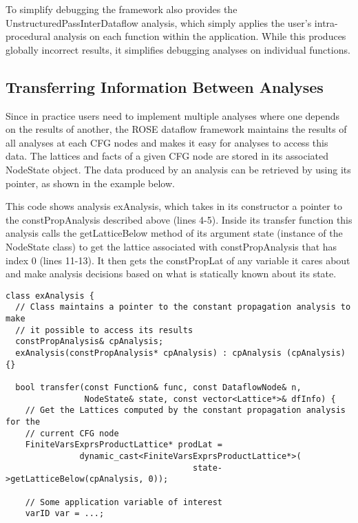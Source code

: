 {To simplify debugging the framework also provides the {\scriptsize UnstructuredPassInterDataflow} analysis, which simply applies the user’s intra-procedural analysis on each function within the application. While this produces globally incorrect results, it simplifies debugging analyses on individual functions. 

\subsection{Transferring Information Between Analyses}
\label{transfer_analyses}
Since in practice users need to implement multiple analyses where one depends on the results of another, the ROSE dataflow framework maintains the results of all analyses at each CFG nodes and makes it easy for analyses to access this data. The lattices and facts of a given CFG node are stored in its associated {\scriptsize NodeState} object. The data produced by an analysis can be retrieved by using its pointer, as shown in the example below.

This code shows analysis {\scriptsize exAnalysis}, which takes in its constructor a pointer to the {\scriptsize constPropAnalysis} described above (lines 4-5). Inside its transfer function this analysis calls the {\scriptsize getLatticeBelow} method of its argument state (instance of the {\scriptsize NodeState} class) to get the lattice associated with {\scriptsize constPropAnalysis} that has index 0 (lines 11-13). It then gets the {\scriptsize constPropLat} of any variable it cares about and make analysis decisions based on what is statically known about its state.

\begin{frame}
\centering
\begin{lstlisting}
class exAnalysis {
  // Class maintains a pointer to the constant propagation analysis to make 
  // it possible to access its results
  constPropAnalysis& cpAnalysis;
  exAnalysis(constPropAnalysis* cpAnalysis) : cpAnalysis (cpAnalysis) {}

  bool transfer(const Function& func, const DataflowNode& n, 
                NodeState& state, const vector<Lattice*>& dfInfo) {
    // Get the Lattices computed by the constant propagation analysis for the 
    // current CFG node
    FiniteVarsExprsProductLattice* prodLat = 
               dynamic_cast<FiniteVarsExprsProductLattice*>(
                                      state->getLatticeBelow(cpAnalysis, 0));

    // Some application variable of interest
    varID var = ...;


\end{lstlisting}
\end{frame}}
